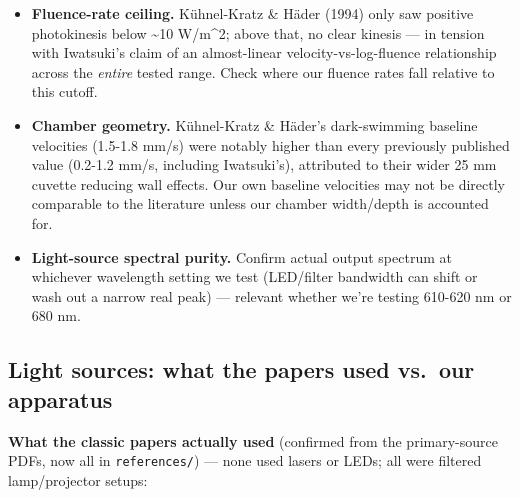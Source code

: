 \documentclass[
]{article}
\providecommand{\tightlist}{%
  \setlength{\itemsep}{0pt}\setlength{\parskip}{0pt}}
\begin{document}
\begin{itemize}
\tightlist
\item
  \textbf{Fluence-rate ceiling.} Kühnel-Kratz \& Häder (1994) only saw
  positive photokinesis below \textasciitilde10 W/m\^{}2; above that, no
  clear kinesis --- in tension with Iwatsuki's claim of an almost-linear
  velocity-vs-log-fluence relationship across the \emph{entire} tested
  range. Check where our fluence rates fall relative to this cutoff.
\item
  \textbf{Chamber geometry.} Kühnel-Kratz \& Häder's dark-swimming
  baseline velocities (1.5-1.8 mm/s) were notably higher than every
  previously published value (0.2-1.2 mm/s, including Iwatsuki's),
  attributed to their wider 25 mm cuvette reducing wall effects. Our own
  baseline velocities may not be directly comparable to the literature
  unless our chamber width/depth is accounted for.
\item
  \textbf{Light-source spectral purity.} Confirm actual output spectrum
  at whichever wavelength setting we test (LED/filter bandwidth can
  shift or wash out a narrow real peak) --- relevant whether we're
  testing 610-620 nm or 680 nm.
\end{itemize}

\hypertarget{light-sources-what-the-papers-used-vs.-our-apparatus}{%
\subsection{Light sources: what the papers used vs.~our
apparatus}\label{light-sources-what-the-papers-used-vs.-our-apparatus}}

\textbf{What the classic papers actually used} (confirmed from the
primary-source PDFs, now all in \texttt{references/}) --- none used
lasers or LEDs; all were filtered lamp/projector setups:
\end{document}
